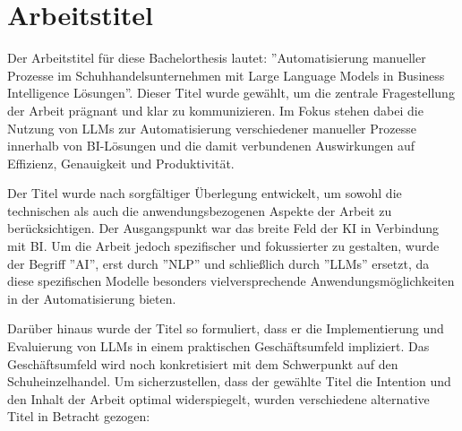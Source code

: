 

\section{Arbeitstitel}

Der Arbeitstitel für diese Bachelorthesis lautet: ''Automatisierung manueller Prozesse im Schuhhandelsunternehmen mit Large Language Models in Business Intelligence Lösungen''. Dieser Titel wurde gewählt, um die zentrale Fragestellung der Arbeit prägnant und klar zu kommunizieren. Im Fokus stehen dabei die Nutzung von LLMs zur Automatisierung verschiedener manueller Prozesse innerhalb von BI-Lösungen und die damit verbundenen Auswirkungen auf Effizienz, Genauigkeit und Produktivität.

Der Titel wurde nach sorgfältiger Überlegung entwickelt, um sowohl die technischen als auch die anwendungsbezogenen Aspekte der Arbeit zu berücksichtigen. Der Ausgangspunkt war das breite Feld der KI in Verbindung mit BI. Um die Arbeit jedoch spezifischer und fokussierter zu gestalten, wurde der Begriff ''AI'', erst durch ''NLP'' und schließlich durch ''LLMs'' ersetzt, da diese spezifischen Modelle besonders vielversprechende Anwendungsmöglichkeiten in der Automatisierung bieten.

Darüber hinaus wurde der Titel so formuliert, dass er die Implementierung und Evaluierung von LLMs in einem praktischen Geschäftsumfeld impliziert. Das Geschäftsumfeld wird noch konkretisiert mit dem Schwerpunkt auf den Schuheinzelhandel.
Um sicherzustellen, dass der gewählte Titel die Intention und den Inhalt der Arbeit optimal widerspiegelt, wurden verschiedene alternative Titel in Betracht gezogen:

